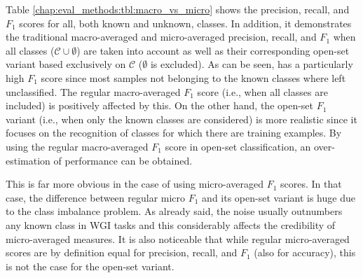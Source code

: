 Table \ref{chap:eval_methods:tbl:macro_vs_micro} shows the precision, recall, and $F_{1}$ scores for all, both known and unknown, classes. In addition, it demonstrates the traditional macro-averaged and micro-averaged precision, recall, and $F_{1}$ when all classes ($\mathcal{C} \cup \emptyset$) are taken into account as well as their corresponding open-set variant based exclusively on $\mathcal{C}$ ($\emptyset$ is excluded). As can be seen, has a particularly high $F_1$ score since most samples not belonging to the known classes where left unclassified. The regular macro-averaged $F_1$ score (i.e., when all classes are included) is positively affected by this. On the other hand, the open-set $F_1$ variant (i.e., when only the known classes are considered) is more realistic since it focuses on the recognition of classes for which there are training examples. By using the regular macro-averaged $F_1$ score in open-set classification, an over-estimation of performance can be obtained. 

This is far more obvious in the case of using micro-averaged $F_1$ scores. In that case, the difference between regular micro $F_1$ and its open-set variant is huge due to the class imbalance problem. As already said, the noise usually outnumbers any known class in WGI tasks and this considerably affects the credibility of micro-averaged measures. It is also noticeable that while regular micro-averaged scores are by definition equal for precision, recall, and $F_1$ (also for accuracy), this is not the case for the open-set variant. 

